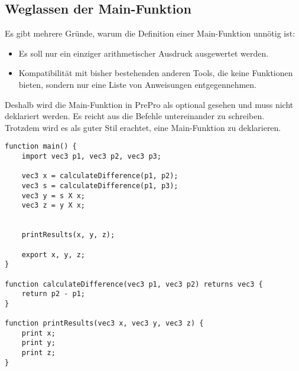 \subsection{Weglassen der Main-Funktion}
Es gibt mehrere Gründe, warum die Definition einer Main-Funktion unnötig ist:
\begin{itemize}
\item Es soll nur ein einziger arithmetischer Ausdruck ausgewertet werden.
\item Kompatibilität mit bisher bestehenden anderen Tools, die keine Funktionen bieten, sondern nur eine Liste von Anweisungen entgegennehmen.
\end{itemize}
Deshalb wird die Main-Funktion in \acs{PrePro} als optional gesehen und muss nicht deklariert werden.
Es reicht aus die Befehle untereinander zu schreiben.\\
Trotzdem wird es als guter Stil erachtet, eine Main-Funktion zu deklarieren.

\begin{lstlisting}[language=prepro, label={lst:Bsp_Funktionen}, caption={Beispiel Funktionen}, captionpos=b]
function main() {
	import vec3 p1, vec3 p2, vec3 p3;

	vec3 x = calculateDifference(p1, p2);
	vec3 s = calculateDifference(p1, p3);
	vec3 y = s X x;
	vec3 z = y X x;


	printResults(x, y, z);

	export x, y, z;
}

function calculateDifference(vec3 p1, vec3 p2) returns vec3 {
	return p2 - p1;
}

function printResults(vec3 x, vec3 y, vec3 z) {
	print x;
	print y;
	print z;
}
\end{lstlisting}

